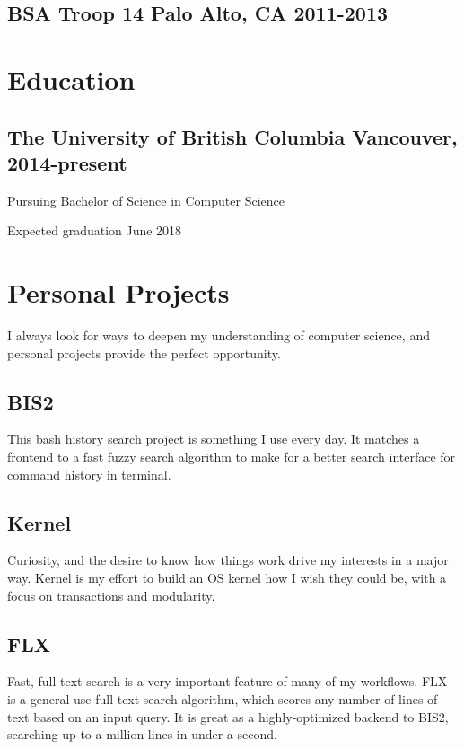 \documentclass[letterpaper]{article}
\newcommand{\subtitle}{\normalfont\sffamily\color{black}\large}
\begin{document}
\begin{multicols}{2}
\subsection*{BSA Troop 14 \subtitle Palo Alto, CA 2011-2013}

\section*{Education}

\subsection*{The University of British Columbia \subtitle Vancouver,
  2014-present}

Pursuing Bachelor of Science in Computer Science

Expected graduation June 2018

\columnbreak

\section*{Personal Projects}

I always look for ways to deepen my understanding of computer science, and
personal projects provide the perfect opportunity.

\subsection*{BIS2}

This bash history search project is something I use every day. It matches a
frontend to a fast fuzzy search algorithm to make for a better search interface
for command history in terminal.

\subsection*{Kernel}

Curiosity, and the desire to know how things work drive my interests in a major
way. Kernel is my effort to build an OS kernel how I wish they could be, with a
focus on transactions and modularity.

\subsection*{FLX}

Fast, full-text search is a very important feature of many of my workflows. FLX
is a general-use full-text search algorithm, which scores any number of lines of
text based on an input query. It is great as a highly-optimized backend to BIS2,
searching up to a million lines in under a second.


\end{multicols}
\end{document}
